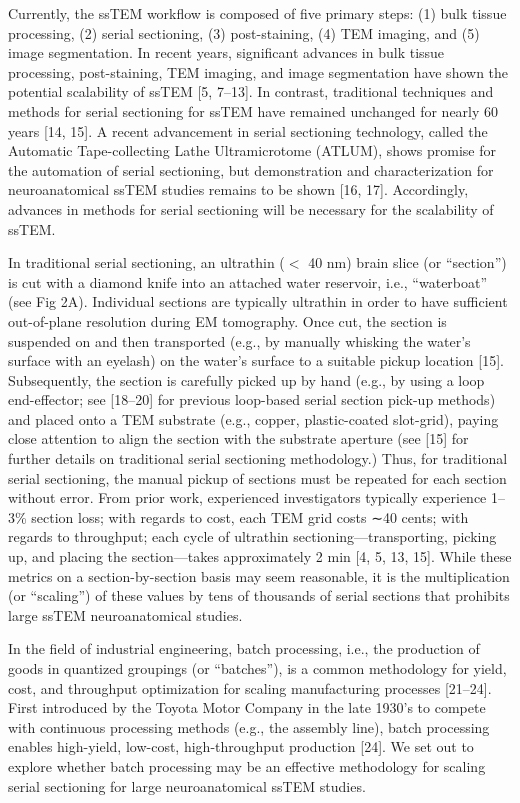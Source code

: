 \documentclass{article}
\begin{document}
Currently, the ssTEM workflow is composed of five primary steps: (1) bulk tissue processing, (2) serial sectioning, (3) post-staining, (4) TEM imaging, and (5) image segmentation. In recent years, significant advances in bulk tissue processing, post-staining, TEM imaging, and image segmentation have shown the potential scalability of ssTEM [5, 7–13]. In contrast, traditional techniques and methods for serial sectioning for ssTEM have remained unchanged for nearly 60 years [14, 15]. A recent advancement in serial sectioning technology, called the Automatic Tape-collecting Lathe Ultramicrotome (ATLUM), shows promise for the automation of serial sectioning, but demonstration and characterization for neuroanatomical ssTEM studies remains to be shown [16, 17]. Accordingly, advances in methods for serial sectioning will be necessary for the scalability of ssTEM.

In traditional serial sectioning, an ultrathin ($<$ 40 nm) brain slice (or “section”) is cut with a diamond knife into an attached water reservoir, i.e., “waterboat” (see Fig 2A). Individual sections are typically ultrathin in order to have sufficient out-of-plane resolution during EM tomography. Once cut, the section is suspended on and then transported (e.g., by manually whisking the water’s surface with an eyelash) on the water’s surface to a suitable pickup location [15]. Subsequently, the section is carefully picked up by hand (e.g., by using a loop end-effector; see [18–20] for previous loop-based serial section pick-up methods) and placed onto a TEM substrate (e.g., copper, plastic-coated slot-grid), paying close attention to align the section with the substrate aperture (see [15] for further details on traditional serial sectioning methodology.) Thus, for traditional serial sectioning, the manual pickup of sections must be repeated for each section without error. From prior work, experienced investigators typically experience 1–3\% section loss; with regards to cost, each TEM grid costs ∼40 cents; with regards to throughput; each cycle of ultrathin sectioning—transporting, picking up, and placing the section—takes approximately 2 min [4, 5, 13, 15]. While these metrics on a section-by-section basis may seem reasonable, it is the multiplication (or “scaling”) of these values by tens of thousands of serial sections that prohibits large ssTEM neuroanatomical studies.

In the field of industrial engineering, batch processing, i.e., the production of goods in quantized groupings (or “batches”), is a common methodology for yield, cost, and throughput optimization for scaling manufacturing processes [21–24]. First introduced by the Toyota Motor Company in the late 1930’s to compete with continuous processing methods (e.g., the assembly line), batch processing enables high-yield, low-cost, high-throughput production [24]. We set out to explore whether batch processing may be an effective methodology for scaling serial sectioning for large neuroanatomical ssTEM studies.
\end{document}
